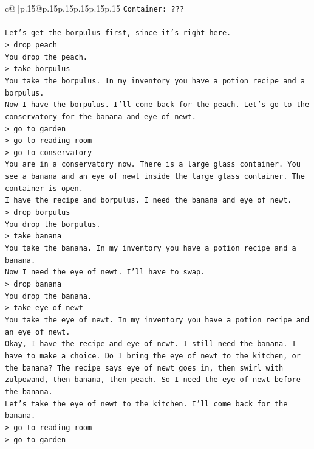 \documentclass{article}
\begin{document}
{\begin{supertabular}{c@{$\;$}|p{.15\linewidth}@{}p{.15\linewidth}p{.15\linewidth}p{.15\linewidth}p{.15\linewidth}p{.15\linewidth}}
{{{\texttt{Container: ???} \\
\\ 
\texttt{Let's get the borpulus first, since it's right here.} \\
\texttt{> drop peach} \\
\texttt{You drop the peach.} \\
\texttt{> take borpulus} \\
\texttt{You take the borpulus. In my inventory you have a potion recipe and a borpulus.} \\
\texttt{Now I have the borpulus. I'll come back for the peach. Let's go to the conservatory for the banana and eye of newt.} \\
\texttt{> go to garden} \\
\texttt{> go to reading room} \\
\texttt{> go to conservatory} \\
\texttt{You are in a conservatory now. There is a large glass container. You see a banana and an eye of newt inside the large glass container. The container is open.} \\
\texttt{I have the recipe and borpulus. I need the banana and eye of newt.} \\
\texttt{> drop borpulus} \\
\texttt{You drop the borpulus.} \\
\texttt{> take banana} \\
\texttt{You take the banana. In my inventory you have a potion recipe and a banana.} \\
\texttt{Now I need the eye of newt. I'll have to swap.} \\
\texttt{> drop banana} \\
\texttt{You drop the banana.} \\
\texttt{> take eye of newt} \\
\texttt{You take the eye of newt. In my inventory you have a potion recipe and an eye of newt.} \\
\texttt{Okay, I have the recipe and eye of newt. I still need the banana. I have to make a choice. Do I bring the eye of newt to the kitchen, or the banana? The recipe says eye of newt goes in, then swirl with zulpowand, then banana, then peach. So I need the eye of newt before the banana.} \\
\texttt{Let's take the eye of newt to the kitchen. I'll come back for the banana.} \\
\texttt{> go to reading room} \\
\texttt{> go to garden} \\
}}}
\end{supertabular}}
\end{document}
